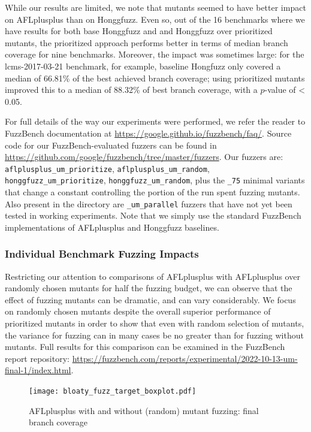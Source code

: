 While our results are limited, we note that mutants seemed to have better impact on AFLplusplus than on Honggfuzz.  Even so, out of  the 16 benchmarks where we have results for both base Honggfuzz and and Honggfuzz over prioritized mutants, the prioritized approach performs better in terms of median branch coverage for nine benchmarks.  Moreover, the impact was sometimes large:  for the lcms-2017-03-21 benchmark, for example, baseline Hongfuzz only covered a median of 66.81\% of the best achieved branch coverage; using prioritized mutants improved this to a median of 88.32\% of best branch coverage, with a $p$-value of < 0.05.

For full details of the way our experiments were performed, we refer the reader to FuzzBench documentation at \url{https://google.github.io/fuzzbench/faq/}.  Source code for our FuzzBench-evaluated fuzzers can be found in \url{https://github.com/google/fuzzbench/tree/master/fuzzers}.  Our fuzzers are: {\tt aflplusplus\_um\_prioritize}, {\tt aflplusplus\_um\_random}, {\tt honggfuzz\_um\_prioritize}, {\tt honggfuzz\_um\_random}, plus the {\tt \_75} minimal variants that change a constant controlling the portion of the run spent fuzzing mutants.  Also present in the directory are {\tt \_um\_parallel} fuzzers that have not yet been tested in working experiments.  Note that we simply use the standard FuzzBench implementations of AFLplusplus and Honggfuzz baselines.

\subsubsection{Individual Benchmark Fuzzing Impacts}
    
Restricting our attention to comparisons of AFLplusplus with AFLplusplus over randomly chosen mutants for half the fuzzing budget, we can observe that the effect of fuzzing mutants can be dramatic, and can vary considerably.  We focus on randomly chosen mutants despite the overall superior performance of prioritized mutants in order to show that even with random selection of mutants, the variance for fuzzing can in many cases be no greater than for fuzzing without mutants.  Full results for this comparison can be examined in the FuzzBench report repository: \url{https://fuzzbench.com/reports/experimental/2022-10-13-um-final-1/index.html}.

\begin{figure}
  \texttt{[image: bloaty\_fuzz\_target\_boxplot.pdf]}
  \caption{AFLplusplus with and without (random) mutant fuzzing: final branch coverage}
  \label{fig:bloatybox}
  
\end{figure}

